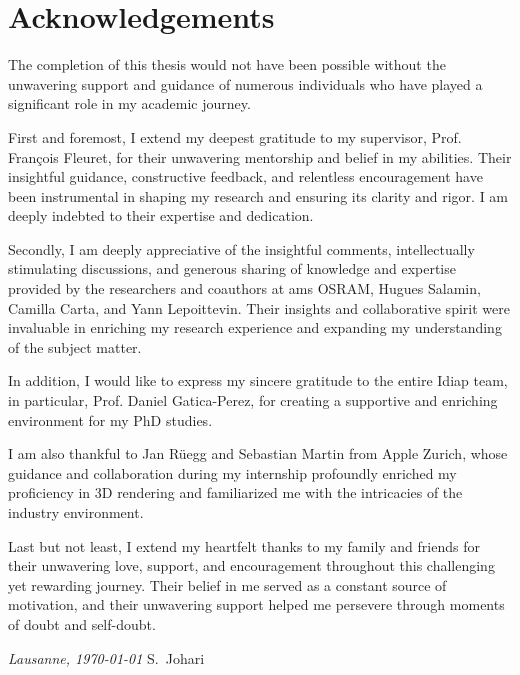 \chapter*{Acknowledgements}
The completion of this thesis would not have been possible without the unwavering support and guidance of numerous individuals who have played a significant role in my academic journey.

\vspace{2ex}
First and foremost, I extend my deepest gratitude to my supervisor, Prof. François Fleuret, for their unwavering mentorship and belief in my abilities. Their insightful guidance, constructive feedback, and relentless encouragement have been instrumental in shaping my research and ensuring its clarity and rigor. I am deeply indebted to their expertise and dedication.

\vspace{2ex}
Secondly, I am deeply appreciative of the insightful comments, intellectually stimulating discussions, and generous sharing of knowledge and expertise provided by the researchers and coauthors at ams OSRAM, Hugues Salamin, Camilla Carta, and Yann Lepoittevin. Their insights and collaborative spirit were invaluable in enriching my research experience and expanding my understanding of the subject matter.

\vspace{2ex}
In addition, I would like to express my sincere gratitude to the entire Idiap team, in particular, Prof. Daniel Gatica-Perez, for creating a supportive and enriching environment for my PhD studies.

\vspace{2ex}
I am also thankful to Jan Rüegg and Sebastian Martin from Apple Zurich, whose guidance and collaboration during my internship profoundly enriched my proficiency in 3D rendering and familiarized me with the intricacies of the industry environment.

\vspace{2ex}
Last but not least, I extend my heartfelt thanks to my family and friends for their unwavering love, support, and encouragement throughout this challenging yet rewarding journey. Their belief in me served as a constant source of motivation, and their unwavering support helped me persevere through moments of doubt and self-doubt.

\bigskip
 
\noindent\textit{Lausanne, \today}
\hfill S.~Johari
